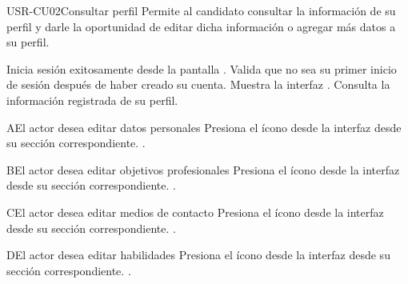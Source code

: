 \begin{UseCase}[]{USR-CU02}{Consultar perfil}{
	Permite al candidato consultar la información de su perfil y darle la oportunidad de editar dicha información o agregar más datos a su perfil.
}
\end{UseCase}

\begin{UCtrayectoria}
	\UCpaso [\UCactor] Inicia sesión exitosamente desde la pantalla .
    \UCpaso [\UCsist] Valida que no sea su primer inicio de sesión después de haber creado su cuenta.
	\UCpaso [\UCsist] Muestra la interfaz .
	\UCpaso [\UCactor] Consulta la información registrada de su perfil. 
\end{UCtrayectoria}

\begin{UCtrayectoriaA}{A}{El actor desea editar datos personales}
	\UCpaso [\UCsist] Presiona el ícono \IUEditar{} desde la interfaz  desde su sección correspondiente.
	.
\end{UCtrayectoriaA} 

\begin{UCtrayectoriaA}{B}{El actor desea editar objetivos profesionales}
	\UCpaso [\UCsist] Presiona el ícono \IUEditar{} desde la interfaz  desde su sección correspondiente.
	.
\end{UCtrayectoriaA} 

\begin{UCtrayectoriaA}{C}{El actor desea editar medios de contacto}
	\UCpaso [\UCsist] Presiona el ícono \IUEditar{} desde la interfaz  desde su sección correspondiente.
	.
\end{UCtrayectoriaA} 

\begin{UCtrayectoriaA}{D}{El actor desea editar habilidades}
	\UCpaso [\UCsist] Presiona el ícono \IUEditar{} desde la interfaz  desde su sección correspondiente.
	.
\end{UCtrayectoriaA} 

